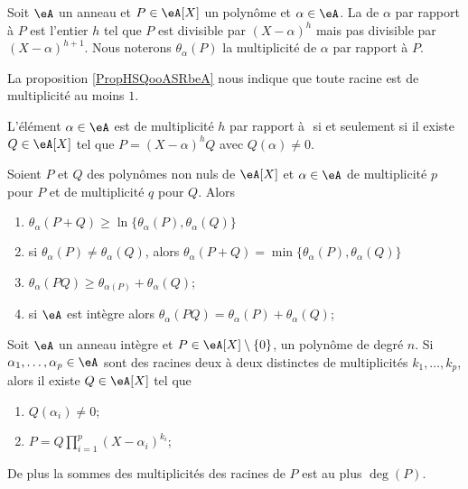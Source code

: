 Soit \( \eA\) un anneau et \( P\in \eA[X]\) un polynôme et \( \alpha\in \eA\). La  de \( \alpha\) par rapport à \( P\) est l'entier \( h\) tel que \( P\) est divisible par \( (X-\alpha)^h\) mais pas divisible par \( (X-\alpha)^{h+1}\).  Nous noterons \( \theta_{\alpha}(P)\) la multiplicité de \( \alpha\) par rapport à \( P\).

La proposition \ref{PropHSQooASRbeA} nous indique que toute racine est de multiplicité au moins \( 1\).

\begin{proposition}     \label{PropahQQpA}
    L'élément \( \alpha\in \eA\) est de multiplicité \( h\) par rapport à \( \) si et seulement si il existe \( Q\in\eA[X]\) tel que \( P=(X-\alpha)^hQ\) avec \( Q(\alpha)\neq 0\).
\end{proposition}

\begin{lemma}       \label{LemIeLhpc}
    Soient \( P\) et \( Q\) des polynômes non nuls de \( \eA[X]\) et \( \alpha\in \eA\) de multiplicité \( p\) pour \( P\) et de multiplicité \( q\) pour \( Q\). Alors
    \begin{enumerate}
        \item
            \( \theta_{\alpha}(P+Q)\geq\ln\{ \theta_{\alpha}(P),\theta_{\alpha}(Q) \}\)
        \item
            si \( \theta_{\alpha}(P)\neq \theta_{\alpha}(Q)\), alors \( \theta_{\alpha}(P+Q)=\min\{ \theta_{\alpha}(P),\theta_{\alpha}(Q) \}\)
        \item
            \( \theta_{\alpha}(PQ)\geq \theta_{\alpha(P)}+\theta_{\alpha}(Q)\);
        \item       \label{ItemIeLhpciv}
            si \(\eA \) est intègre alors \( \theta_{\alpha}(PQ)= \theta_{\alpha}(P)+\theta_{\alpha}(Q)\);
    \end{enumerate}
\end{lemma}

\begin{theorem} \label{ThoSVZooMpNANi}
    Soit \( \eA\) un anneau intègre et \( P\in \eA[X]\setminus\{ 0 \}\), un polynôme de degré \( n\). Si \( \alpha_1,\ldots, \alpha_p\in\eA\) sont des racines deux à deux distinctes de multiplicités \( k_1,\ldots, k_p\), alors il existe \( Q\in \eA[X]\) tel que
    \begin{enumerate}
        \item
            \( Q(\alpha_i)\neq 0\);
        \item
            \( P=Q\prod_{i=1}^p(X-\alpha_i)^{k_i}\);
    \end{enumerate}
    De plus la sommes des multiplicités des racines de \( P\) est au plus \( \deg(P)\).
\end{theorem}

